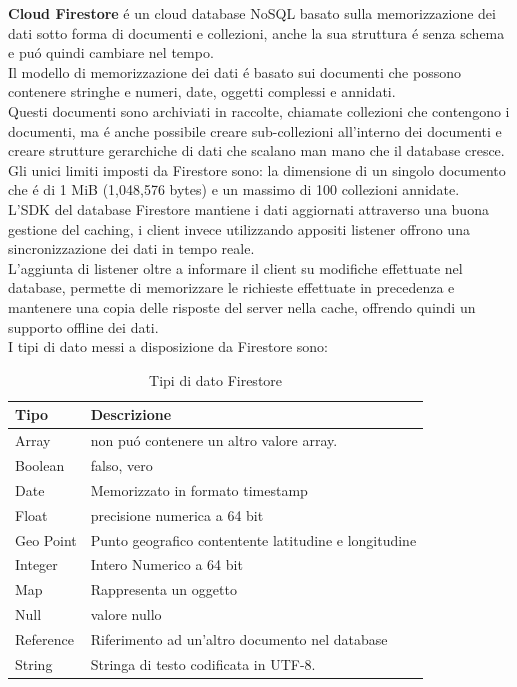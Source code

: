 \textbf{Cloud Firestore} \'e un cloud database NoSQL basato sulla memorizzazione dei dati sotto forma di documenti e collezioni, anche la sua struttura \'e senza schema e pu\'o quindi cambiare nel tempo.\\
Il modello di memorizzazione dei dati \'e basato sui documenti che possono contenere  stringhe e numeri, date, oggetti complessi e annidati.\\
Questi documenti sono archiviati in raccolte, chiamate collezioni che contengono i documenti, ma \'e anche possibile creare sub-collezioni all'interno dei documenti e creare strutture gerarchiche di dati che scalano man mano che il database cresce.\\
Gli unici limiti imposti da Firestore sono: la dimensione di un singolo documento che \'e di 1 MiB (1,048,576 bytes) e un massimo di 100 collezioni annidate.\\
L'SDK del database Firestore mantiene i dati aggiornati attraverso una buona gestione del caching, i client invece utilizzando appositi listener offrono una sincronizzazione dei dati in tempo reale.\\
L'aggiunta di listener oltre a informare il client su modifiche effettuate nel database, permette di memorizzare le richieste effettuate in precedenza e mantenere una copia delle risposte del server nella cache, offrendo quindi un supporto offline dei dati.\\

I tipi di dato messi a disposizione da Firestore sono:

\begin{table}[h]
\begin{center}
\begin{tabular}{|p{3cm}|p{10cm}|}
    \hline
\textbf{Tipo} & \textbf{Descrizione} \\ \hline
Array & non pu\'o contenere un altro valore array. \\ \hline
Boolean & falso, vero  \\ \hline
Date & Memorizzato in formato timestamp \\ \hline
Float & precisione numerica a 64 bit \\ \hline
Geo Point & Punto geografico contentente latitudine e longitudine \\ \hline
Integer & Intero Numerico a 64 bit \\ \hline
Map & Rappresenta un oggetto  \\ \hline
Null & valore nullo \\ \hline
Reference & Riferimento ad un'altro documento nel database  \\ \hline
String & Stringa di testo codificata in UTF-8.\\
\hline
\end{tabular}
\caption[Dati Firestore]{Tipi di dato Firestore}\label{tab:Firestore Tipi di dato}
\end{center}
\end{table}

